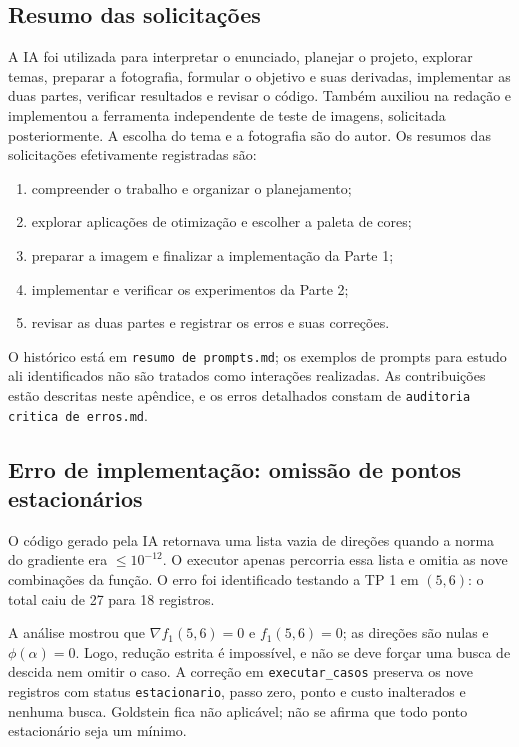 \documentclass[12pt,a4paper]{article}
\begin{document}
\subsection{Resumo das solicitações}
A IA foi utilizada para interpretar o enunciado, planejar o projeto,
explorar temas, preparar a fotografia, formular o objetivo e suas
derivadas, implementar as duas partes, verificar resultados e revisar o
código. Também auxiliou na redação e implementou a ferramenta independente
de teste de imagens, solicitada posteriormente. A escolha do tema e a fotografia são
do autor. Os resumos das solicitações efetivamente registradas são:
\begin{enumerate}
\item compreender o trabalho e organizar o planejamento;
\item explorar aplicações de otimização e escolher a paleta de cores;
\item preparar a imagem e finalizar a implementação da Parte 1;
\item implementar e verificar os experimentos da Parte 2;
\item revisar as duas partes e registrar os erros e suas correções.
\end{enumerate}
O histórico está em \texttt{resumo de prompts.md}; os exemplos de
prompts para estudo ali identificados não são tratados como interações
realizadas. As contribuições estão descritas neste apêndice, e os erros
detalhados constam de \texttt{auditoria critica de erros.md}.

\subsection{Erro de implementação: omissão de pontos estacionários}
O código gerado pela IA retornava uma lista vazia de direções quando a
norma do gradiente era $\leq10^{-12}$. O executor apenas percorria essa
lista e omitia as nove combinações da função. O erro foi identificado
testando a TP 1 em $(5,6)$: o total caiu de 27 para 18 registros.

A análise mostrou que $\nabla f_1(5,6)=0$ e $f_1(5,6)=0$; as direções são
nulas e $\phi(\alpha)=0$. Logo, redução estrita é impossível, e não se deve
forçar uma busca de descida nem omitir o caso.
A correção em \texttt{executar\_casos} preserva os nove registros com
status \texttt{estacionario}, passo zero, ponto e custo inalterados e
nenhuma busca. Goldstein fica não aplicável; não se afirma que todo ponto
estacionário seja um mínimo.
\end{document}
